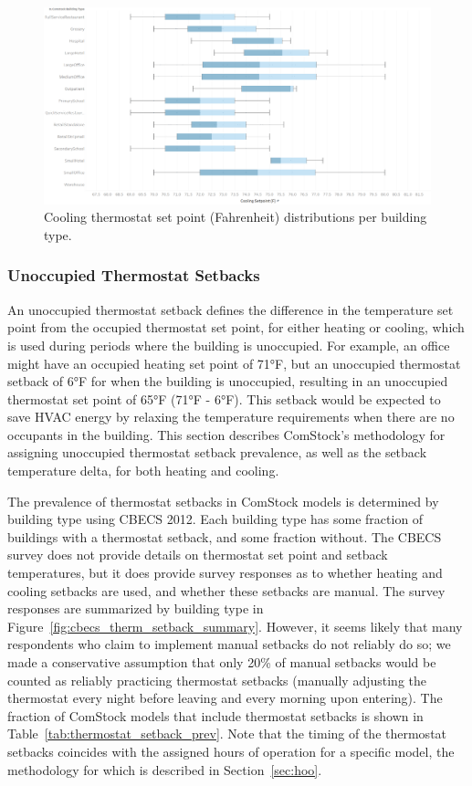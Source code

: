 \begin{figure}
    \centering \includegraphics[width=1.0\textwidth]{figures/cooling_setpoints.png}
    \caption{Cooling thermostat set point (Fahrenheit) distributions per building type.}
    \label{fig:clg_therm_setpoints}
\end{figure}

\pagebreak
\subsubsection{Unoccupied Thermostat Setbacks}

An unoccupied thermostat setback defines the difference in the temperature set point from the occupied thermostat set point, for either heating or cooling, which is used during periods where the building is unoccupied. For example, an office might have an occupied heating set point of 71°F, but an unoccupied thermostat setback of 6°F for when the building is unoccupied, resulting in an unoccupied thermostat set point of 65°F (71°F - 6°F). This setback would be expected to save HVAC energy by relaxing the temperature requirements when there are no occupants in the building. This section describes ComStock's methodology for assigning unoccupied thermostat setback prevalence, as well as the setback temperature delta, for both heating and cooling.

The prevalence of thermostat setbacks in ComStock models is determined by building type using CBECS 2012. Each building type has some fraction of buildings with a thermostat setback, and some fraction without. The CBECS survey does not provide details on thermostat set point and setback temperatures, but it does provide survey responses as to whether heating and cooling setbacks are used, and whether these setbacks are manual. The survey responses are summarized by building type in Figure~\ref{fig:cbecs_therm_setback_summary}. However, it seems likely that many respondents who claim to implement manual setbacks do not reliably do so; we made a conservative assumption that only 20\% of manual setbacks would be counted as reliably practicing thermostat setbacks (manually adjusting the thermostat every night before leaving and every morning upon entering). The fraction of ComStock models that include thermostat setbacks is shown in Table~\ref{tab:thermostat_setback_prev}. Note that the timing of the thermostat setbacks coincides with the assigned hours of operation for a specific model, the methodology for which is described in Section~\ref{sec:hoo}.

